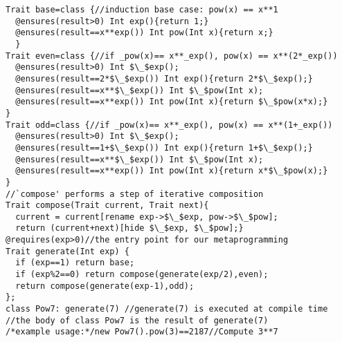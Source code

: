 \begin{lstlisting}[firstnumber=11]
Trait base=class {//induction base case: pow(x) == x**1
  @ensures(result>0) Int exp(){return 1;}  
  @ensures(result==x**exp()) Int pow(Int x){return x;}
  }
Trait even=class {//if _pow(x)== x**_exp(), pow(x) == x**(2*_exp())
  @ensures(result>0) Int $\_$exp();
  @ensures(result==2*$\_$exp()) Int exp(){return 2*$\_$exp();}
  @ensures(result==x**$\_$exp()) Int $\_$pow(Int x);
  @ensures(result==x**exp()) Int pow(Int x){return $\_$pow(x*x);}
}
Trait odd=class {//if _pow(x)== x**_exp(), pow(x) == x**(1+_exp())
  @ensures(result>0) Int $\_$exp();
  @ensures(result==1+$\_$exp()) Int exp(){return 1+$\_$exp();}
  @ensures(result==x**$\_$exp()) Int $\_$pow(Int x);
  @ensures(result==x**exp()) Int pow(Int x){return x*$\_$pow(x);}
}
//`compose' performs a step of iterative composition
Trait compose(Trait current, Trait next){
  current = current[rename exp->$\_$exp, pow->$\_$pow];
  return (current+next)[hide $\_$exp, $\_$pow];}
@requires(exp>0)//the entry point for our metaprogramming
Trait generate(Int exp) {
  if (exp==1) return base;
  if (exp%2==0) return compose(generate(exp/2),even);
  return compose(generate(exp-1),odd);
};
class Pow7: generate(7) //generate(7) is executed at compile time
//the body of class Pow7 is the result of generate(7)
/*example usage:*/new Pow7().pow(3)==2187//Compute 3**7
\end{lstlisting}
\vspace{-1ex}